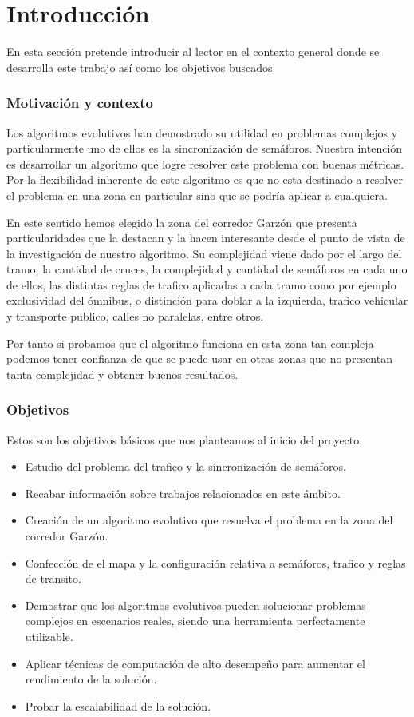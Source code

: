 \chapter{Introducción}
En esta sección pretende introducir al lector en el contexto general donde se desarrolla este trabajo así como los objetivos buscados.

\subsection{Motivación y contexto}

Los algoritmos evolutivos han demostrado su utilidad en problemas complejos y particularmente uno de ellos es la sincronización de semáforos. Nuestra intención es desarrollar un algoritmo que logre resolver este problema con buenas métricas.
Por la flexibilidad inherente de este algoritmo es que no esta destinado a resolver el problema en una zona en particular sino que se podría aplicar a cualquiera.

En este sentido hemos elegido la zona del corredor Garzón que presenta particularidades que la destacan y la hacen interesante desde el punto de vista de la investigación de nuestro algoritmo. Su complejidad viene dado por el largo del tramo, la cantidad de cruces, la complejidad y cantidad de semáforos en cada uno de ellos, las distintas reglas de trafico aplicadas a cada tramo como por ejemplo exclusividad del ómnibus, o distinción para doblar a la izquierda, trafico vehicular y transporte publico, calles no paralelas, entre otros.

Por tanto si probamos que el algoritmo funciona en esta zona tan compleja podemos tener confianza de que se puede usar en otras zonas que no presentan tanta complejidad y obtener buenos resultados.



\newpage

\subsection{Objetivos}

Estos son los objetivos básicos que nos planteamos al inicio del  proyecto.


\begin{itemize}
	\item Estudio del problema del trafico y la sincronización de semáforos.
	\item Recabar información sobre trabajos relacionados en este ámbito.
	\item Creación de un algoritmo evolutivo que resuelva el problema en la zona del corredor Garzón.
	\item Confección de el mapa y la configuración relativa a semáforos, trafico y reglas de transito.	
	\item Demostrar que los algoritmos evolutivos pueden solucionar problemas complejos en escenarios  reales, siendo una herramienta perfectamente utilizable.
	\item Aplicar técnicas de computación de alto desempeño para aumentar el rendimiento de la solución.
	\item Probar la escalabilidad de la solución.
\end{itemize}

